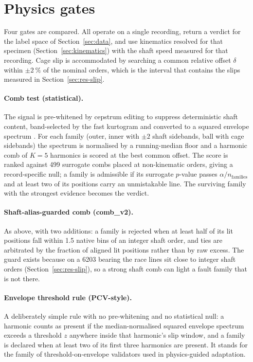 \section{Physics gates}
\label{sec:gates}

Four gates are compared. All operate on a single recording, return a verdict for the label space of
Section~\ref{sec:data}, and use kinematics resolved for that specimen (Section~\ref{sec:kinematics}) with the shaft speed
measured for that recording. Cage slip is accommodated by searching a common relative offset $\delta$ within
$\pm\SI{2}{\percent}$ of the nominal orders, which is the interval that contains the slips measured in
Section~\ref{sec:res-slip}.

\paragraph{Comb test (statistical).} The signal is pre-whitened by cepstrum editing to suppress deterministic shaft
content, band-selected by the fast kurtogram \cite{antoni2007kurtogram} and converted to a squared envelope spectrum
\cite{randall2011}. For each family (outer, inner with $\pm2$ shaft sidebands, ball with cage sidebands) the spectrum is
normalised by a running-median floor and a harmonic comb of $K=5$ harmonics is scored at the best common offset. The score
is ranked against 499 surrogate combs placed at non-kinematic orders, giving a record-specific null; a family is admissible
if its surrogate $p$-value passes $\alpha/n_{\mathrm{families}}$ and at least two of its positions carry an unmistakable
line. The surviving family with the strongest evidence becomes the verdict.

\paragraph{Shaft-alias-guarded comb (comb\_v2).} As above, with two additions: a family is rejected when at least half of
its lit positions fall within 1.5 native bins of an integer shaft order, and ties are arbitrated by the fraction of aligned
lit positions rather than by raw excess. The guard exists because on a 6203 bearing the race lines sit close to integer
shaft orders (Section~\ref{sec:res-slip}), so a strong shaft comb can light a fault family that is not there.

\paragraph{Envelope threshold rule (PCV-style).} A deliberately simple rule with no pre-whitening and no statistical null: a
harmonic counts as present if the median-normalised squared envelope spectrum exceeds a threshold $z$ anywhere inside that
harmonic's slip window, and a family is declared when at least two of its first three harmonics are present. It stands for
the family of threshold-on-envelope validators used in physics-guided adaptation.

